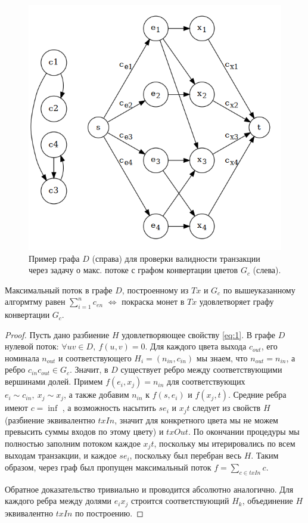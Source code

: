\documentclass[specification,annotation]{itmo-student-thesis}
\begin{document}
\begin{figure}[h]
  \caption{Пример графа $D$ (справа) для проверки валидности
    транзакции через задачу о макс. потоке с графом конвертации цветов
    $G_c$ (слева). \label{fig:txgraph1}} \centering
  \includegraphics[scale=0.45]{txgraph1}
\end{figure}

\begin{lemma}
  Максимальный поток в графе $D$, построенному из $Tx$ и $G_c$ по
  вышеуказанному алгормтму равен $\sum_{i=1}^n{c_{en}}$
  $\Leftrightarrow$ покраска монет в $Tx$ удовлетворяет графу
  конвертации $G_c$.
\end{lemma}
\begin{proof}
  Пусть дано разбиение $H$ удовлетворяющее свойству \ref{eq:1}. В
  графе $D$ нулевой поток: $\forall uv \in D, \ f(u,v) = 0$. Для
  каждого цвета выхода $c_{out}$, его номинала $n_{out}$ и
  соответствующего $H_i = (n_{in}, c_{in})$ мы знаем, что $n_{out} =
  n_{in}$, а ребро $c_{in}c_{out} \in G_c$. Значит, в $D$ существует
  ребро между соответствующими вершинами долей. Примем $f(e_i,x_j) =
  n_{in}$ для соответствующих $e_i \sim c_{in}, \ x_j \sim x_j$, а
  также добавим $n_{in}$ к $f(s,e_i)$ и $f(x_j,t)$. Средние ребра
  имеют $c = \inf$ , а возможность насытить $se_i$ и $x_jt$ следует из
  свойств $H$ (разбиение эквивалентно $txIn$, значит для конкретного
  цвета мы не можем превысить суммы входов по этому цвету) и
  $txOut$. По окончании процедуры мы полностью заполним потоком каждое
  $x_jt$, поскольку мы итерировались по всем выходам транзакции, и
  каждое $se_i$, поскольку был перебран весь $H$. Таким образом, через
  граф был пропущен максимальный поток $f = \sum_{c \in txIn}{c}$.

  Обратное доказательство тривиально и проводится абсолютно
  аналогично. Для каждого ребра между долями $e_ix_j$ строится
  соответствующий $H_k$, объединение $H$ эквивалентно $txIn$ по
  построению.
\end{proof}
\end{document}
